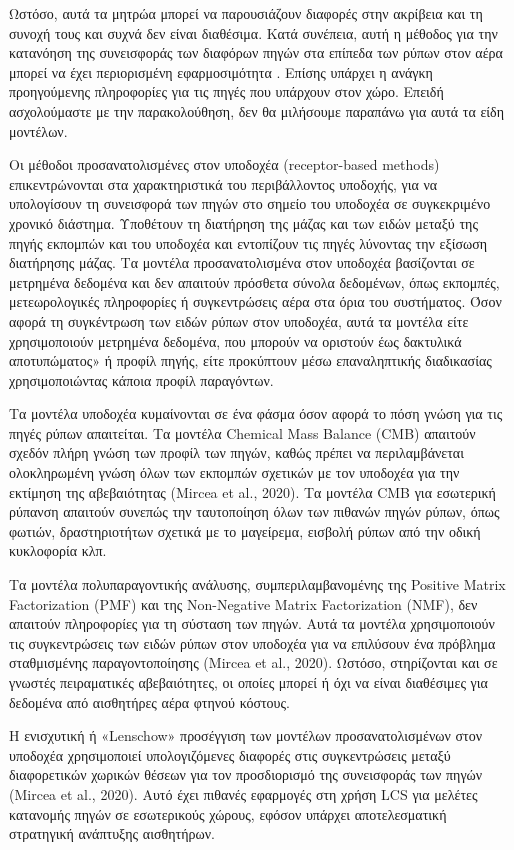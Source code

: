  Ωστόσο, αυτά τα μητρώα μπορεί να παρουσιάζουν διαφορές στην ακρίβεια και τη συνοχή τους και συχνά δεν είναι διαθέσιμα. Κατά συνέπεια, αυτή η μέθοδος για την κατανόηση της συνεισφοράς των διαφόρων πηγών στα επίπεδα των ρύπων στον αέρα 
  μπορεί να έχει περιορισμένη εφαρμοσιμότητα \cite{Higgins2024}. Επίσης υπάρχει η ανάγκη προηγούμενης πληροφορίες για τις πηγές που υπάρχουν στον χώρο. Επειδή ασχολούμαστε με την παρακολούθηση, δεν θα μιλήσουμε παραπάνω για αυτά τα είδη μοντέλων.

Οι μέθοδοι προσανατολισμένες στον υποδοχέα (receptor-based methods) επικεντρώνονται στα χαρακτηριστικά του περιβάλλοντος υποδοχής, για να υπολογίσουν τη συνεισφορά των πηγών στο σημείο του υποδοχέα σε συγκεκριμένο χρονικό διάστημα.
Υποθέτουν τη διατήρηση της μάζας και των ειδών μεταξύ της πηγής εκπομπών και του υποδοχέα και εντοπίζουν τις πηγές λύνοντας την εξίσωση διατήρησης μάζας. 
Τα μοντέλα προσανατολισμένα στον υποδοχέα βασίζονται σε μετρημένα δεδομένα και δεν απαιτούν πρόσθετα σύνολα δεδομένων, όπως εκπομπές, μετεωρολογικές πληροφορίες ή συγκεντρώσεις αέρα στα όρια του συστήματος.
 Όσον αφορά τη συγκέντρωση των ειδών ρύπων στον υποδοχέα, αυτά τα μοντέλα είτε χρησιμοποιούν μετρημένα δεδομένα, που μπορούν να οριστούν έως δακτυλικά αποτυπώματος» ή προφίλ πηγής, είτε προκύπτουν μέσω επαναληπτικής διαδικασίας χρησιμοποιώντας κάποια προφίλ παραγόντων.

Τα μοντέλα υποδοχέα κυμαίνονται σε ένα φάσμα όσον αφορά το πόση γνώση για τις πηγές ρύπων απαιτείται.
 Τα μοντέλα Chemical Mass Balance (CMB) απαιτούν σχεδόν πλήρη γνώση των προφίλ των πηγών, καθώς πρέπει να περιλαμβάνεται ολοκληρωμένη γνώση όλων των εκπομπών σχετικών με τον υποδοχέα για την εκτίμηση της αβεβαιότητας (Mircea et al., 2020).
  Τα μοντέλα CMB για εσωτερική ρύπανση απαιτούν συνεπώς την ταυτοποίηση όλων των πιθανών πηγών ρύπων, όπως φωτιών, δραστηριοτήτων σχετικά με το μαγείρεμα, εισβολή ρύπων από την οδική κυκλοφορία κλπ.

Τα μοντέλα πολυπαραγοντικής ανάλυσης, συμπεριλαμβανομένης της Positive Matrix Factorization (PMF) 
και της Non-Negative Matrix Factorization (NMF), δεν απαιτούν πληροφορίες για τη σύσταση των πηγών. 
Αυτά τα μοντέλα χρησιμοποιούν τις συγκεντρώσεις των ειδών ρύπων στον υποδοχέα για να επιλύσουν ένα πρόβλημα σταθμισμένης παραγοντοποίησης (Mircea et al., 2020). 
Ωστόσο, στηρίζονται και σε γνωστές πειραματικές αβεβαιότητες, οι οποίες μπορεί ή όχι να είναι διαθέσιμες για δεδομένα από αισθητήρες αέρα φτηνού κόστους.

Η ενισχυτική ή «Lenschow» προσέγγιση των μοντέλων προσανατολισμένων στον υποδοχέα χρησιμοποιεί υπολογιζόμενες διαφορές στις συγκεντρώσεις μεταξύ διαφορετικών χωρικών θέσεων για τον προσδιορισμό της συνεισφοράς των πηγών (Mircea et al., 2020).
 Αυτό έχει πιθανές εφαρμογές στη χρήση LCS για μελέτες κατανομής πηγών σε εσωτερικούς χώρους, εφόσον υπάρχει αποτελεσματική στρατηγική ανάπτυξης αισθητήρων.


